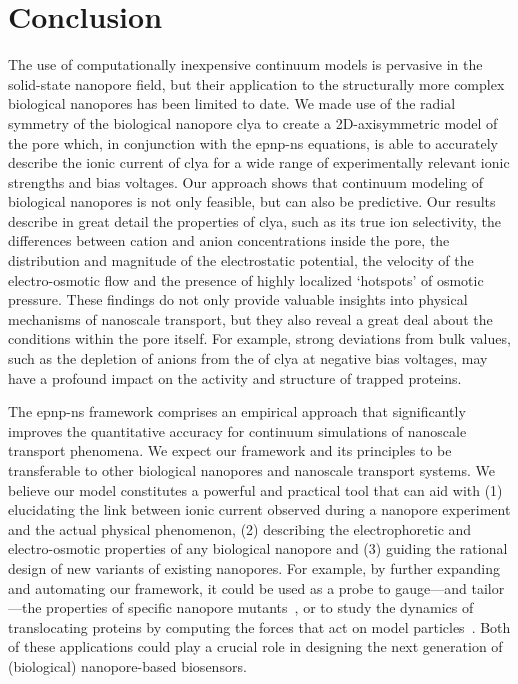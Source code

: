 \section{Conclusion}
%
\label{sec:transport:conclusion}
%

The use of computationally inexpensive continuum models is pervasive in the solid-state nanopore field, but
their application to the structurally more complex biological nanopores has been limited to date. We made use
of the radial symmetry of the biological nanopore \gls{clya} to create a 2D-axisymmetric model of the pore
which, in conjunction with the \gls{epnp-ns} equations, is able to accurately describe the ionic current of
\gls{clya} for a wide range of experimentally relevant ionic strengths and bias voltages. Our approach shows
that continuum modeling of biological nanopores is not only feasible, but can also be predictive. Our results
describe in great detail the properties of \gls{clya}, such as its true ion selectivity, the differences
between cation and anion concentrations inside the pore, the distribution and magnitude of the electrostatic
potential, the velocity of the electro-osmotic flow and the presence of highly localized `hotspots' of osmotic
pressure. These findings do not only provide valuable insights into physical mechanisms of nanoscale
transport, but they also reveal a great deal about the conditions within the pore itself. For example, strong
deviations from bulk values, such as the depletion of anions from the \lumen{} of \gls{clya} at negative bias
voltages, may have a profound impact on the activity and structure of trapped proteins.

The \gls{epnp-ns} framework comprises an empirical approach that significantly improves the quantitative
accuracy for continuum simulations of nanoscale transport phenomena. We expect our framework and its
principles to be transferable to other biological nanopores and nanoscale transport systems. We believe our
model constitutes a powerful and practical tool that can aid with (1) elucidating the link between ionic
current observed during a nanopore experiment and the actual physical phenomenon, (2) describing the
electrophoretic and electro-osmotic properties of any biological nanopore and (3) guiding the rational design
of new variants of existing nanopores. For example, by further expanding and automating our framework, it
could be used as a probe to gauge---and tailor---the properties of specific nanopore
mutants~\cite{Huang-2020,Cao-2019}, or to study the dynamics of translocating proteins by computing the forces
that act on model particles~\cite{Willems-Ruic-Biesemans-2019}. Both of these applications could play a
crucial role in designing the next generation of (biological) nanopore-based biosensors.


